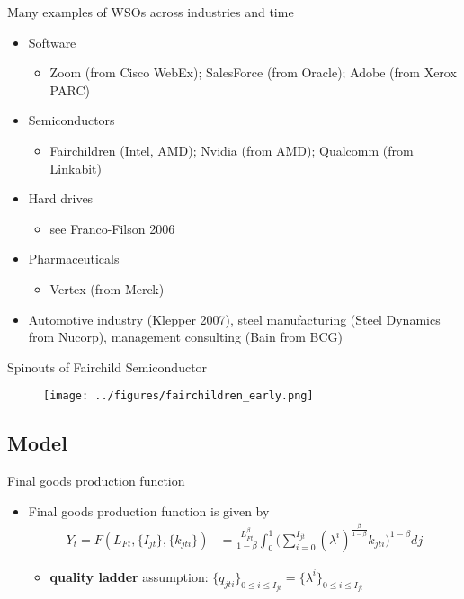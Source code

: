 \documentclass[english,usenames,dvipsnames]{beamer}
\begin{document}
\begin{frame}{Many examples of WSOs across industries and time}\label{spinouts_examples}
	\hyperlink{motivation}{}
	\begin{itemize}
		\item Software
		\begin{itemize}
			\item Zoom (from Cisco WebEx); SalesForce (from Oracle); Adobe (from Xerox PARC)
		\end{itemize}
		\smallskip
		\item Semiconductors
		\begin{itemize}
			\item Fairchildren (Intel, AMD); Nvidia (from AMD); Qualcomm (from Linkabit)
		\end{itemize}
		\smallskip
		\item Hard drives
		\begin{itemize}
			\item see Franco-Filson 2006
		\end{itemize}
		\smallskip
		\item Pharmaceuticals
		\begin{itemize}
			\item Vertex (from Merck)
		\end{itemize}
		\item Automotive industry (Klepper 2007), steel manufacturing (Steel Dynamics from Nucorp), management consulting (Bain from BCG)
	\end{itemize}
\end{frame}


\begin{frame}{Spinouts of Fairchild Semiconductor}\label{fairchildren_early}
\hyperlink{motivation_background}{}
\begin{figure}
	\texttt{[image: ../figures/fairchildren\_early.png]}
\end{figure}
\end{frame}

\subsection{Model}

\begin{frame}{Final goods production function}\label{definition:final_goods_production}\hyperlink{main:final_goods_production}{}
	\begin{itemize}
		\item Final goods production function is given by
		\begin{align*}
		Y_t = F(L_{Ft},\{I_{jt}\},\{k_{jti}\}) &= \frac{L_{Ft}^{\beta}}{1-\beta} \int_0^1 \Big(\sum_{i = 0}^{I_{jt}} (\lambda^{i})^{\frac{\beta}{1-\beta}} k_{jti} \Big)^{1-\beta} dj
		\end{align*}
		\begin{itemize}
			\item \alert{\textbf{quality ladder}} assumption: $\{q_{jti}\}_{0 \le i \le I_{jt}} = \{\lambda^i\}_{0 \le i \le I_{jt}}$
		\end{itemize}
	\end{itemize}
\end{frame}
\end{document}

